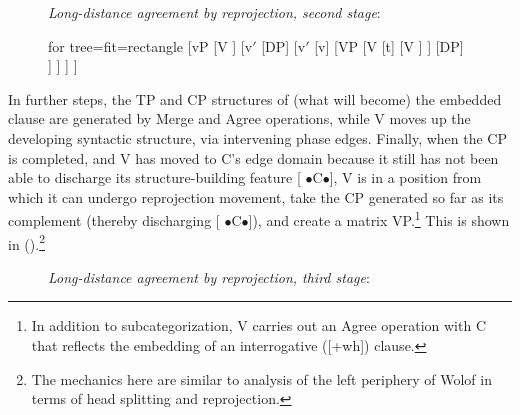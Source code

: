 \documentclass[output=paper
,modfonts
,nonflat]{langsci/langscibook}
\begin{document}
	\begin{figure}[!h]
		\begin{exe}
			\ex	\label{ex:mueller:33} {\textit{Long-distance agreement \label{Baum2}by reprojection, second stage}}:\\
				\begin{forest} 	for tree={fit=rectangle}
					[vP
					[V ]
					[v$'$
					[DP]
					[v$'$
					[v] 
					[VP
					[V
					[t]
					[V  ] ]
					[DP]
					] ] ] ]	
			\end{forest}
		\end{exe} \vspace{-0.6cm}
	\end{figure}
\noindent In further steps, the TP and CP structures of (what will become) the
	embedded clause are generated by Merge and Agree operations, while V moves up
	the developing syntactic structure, via intervening phase
	edges. Finally, when the CP is completed, and V has moved to C's
	edge domain because it still has not been able to discharge its
	structure-building feature [{\small
		$\bullet$}C{\small $\bullet$}], V is in a position from which it
	can undergo reprojection movement, take the CP generated so far as
	its complement (thereby discharging [{\small
		$\bullet$}C{\small $\bullet$}]), and create a matrix
	VP.\footnote{In addition to subcategorization, V carries out an
		Agree operation with C that reflects the embedding of an
		interrogative ([+wh]) clause.} This is
	shown in (\Next).\footnote{The mechanics here are similar to 
		 analysis of the left periphery of Wolof
		in terms of head splitting and reprojection.}   
\begin{figure}[!h]
	\begin{exe} 
		\ex	\label{ex:mueller:34} {\textit{Long-distance agreement \label{Baum3}by reprojection, third stage}}:\\
	\end{exe} \vspace{-0.8cm}
\end{figure} 		
\end{document}
